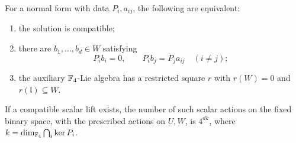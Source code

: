 \begin{theorem}\label{thm:compatibility}
For a normal form with data \(P_i,a_{ij}\), the following are equivalent:
\begin{enumerate}
\item the solution is compatible;
\item there are \(b_1,\ldots,b_d\in W\) satisfying
\begin{equation}\label{eq:compatibility-system}
 P_ib_i=0,\qquad P_ib_j=P_ja_{ij}\quad(i\ne j);
\end{equation}
\item the auxiliary \(\mathbb F_4\)-Lie algebra has a restricted square \(r\)
with \(r(W)=0\) and \(r(\mathfrak l)\subseteq W\).
\end{enumerate}
If a compatible scalar lift exists, the number of such scalar actions
on the fixed binary space, with the prescribed actions on \(U,W\), is
\(4^{dk}\), where \(k=\dim_{\mathbb F_4}\bigcap_i\ker P_i\).
\end{theorem}
